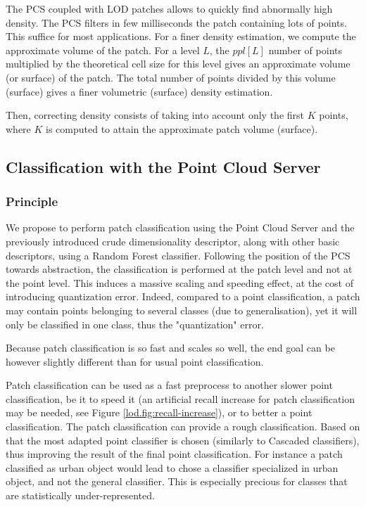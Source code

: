 		The PCS coupled with LOD patches allows to quickly find abnormally high density.
		The PCS filters in few milliseconds the patch containing lots of points. This suffice for most applications.
		For a finer density estimation, we compute the approximate volume of the patch.
		For a level $L$, the $ppl[L]$ number of points multiplied by the theoretical cell size for this level gives an approximate volume (or surface) of the patch.
		The total number of points divided by this volume (surface) gives a finer volumetric (surface) density estimation.
		
		Then, correcting density consists of taking into account only the first $K$ points, where $K$ is computed to attain the approximate patch volume (surface).
		
		
	\subsection{Classification with the Point Cloud Server}
		\label{lod.method.classif}
		\subsubsection{Principle}
		
		We propose to perform patch classification using the Point Cloud Server and the previously introduced crude dimensionality descriptor, along with other basic descriptors, using a Random Forest classifier.
		Following the position of the PCS towards abstraction, the classification is performed at the patch level and not at the point level. 
		This induces a massive scaling and speeding effect, at the cost of introducing quantization error.
		Indeed, compared to a point classification, a patch may contain points belonging to several classes (due to generalisation), yet it will only be classified in one class, thus the "quantization" error.
		
		Because patch classification is so fast and scales so well,
		the end goal can be however slightly different than for usual point classification.
		
		
		Patch classification can be used as a fast preprocess to another slower point classification,
		be it to speed it (an artificial recall increase for patch classification may be needed, see Figure \ref{lod.fig:recall-increase}), or to better a point classification.
		The patch classification can provide a rough classification.
		Based on that the most adapted point classifier is chosen 
		(similarly to Cascaded classifiers),
		thus improving the result of the final point classification.
		For instance a patch classified as urban object would lead to chose a classifier specialized in urban object, and not the general classifier.
		This is especially precious for classes that are statistically under-represented.
		 
